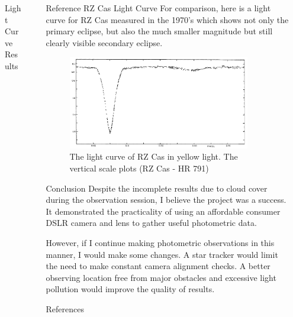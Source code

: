 \documentclass[final]{beamer}
\newlength{\sepwidth}
\newlength{\colwidth}
\newcommand{\separatorcolumn}{\begin{column}{\sepwidth}\end{column}}
\begin{document}
\begin{frame}[t]
\begin{columns}[t]
\begin{column}{\colwidth}
\begin{block}{Light Curve Results}
  \end{block}

\end{column}

\separatorcolumn

\begin{column}{\colwidth}

  \begin{block}{Reference RZ Cas Light Curve}
    For comparison, here is a light curve for RZ Cas measured in the 1970's
    which shows not only the primary eclipse, but also the much smaller magnitude
    but still clearly visible secondary eclipse.

    \begin{figure}
      \centering
      \includegraphics[width=0.9\textwidth]{Reference_RZ_Cas_Light_Curve.png}
        \caption{The light curve of RZ Cas in yellow light. The vertical scale plots \textbf{} (RZ Cas - HR 791) \cite{Chambliss_1976}}
    \end{figure}

  \end{block}

  \begin{block}{Conclusion}
    Despite the incomplete results due to cloud cover during the observation
    session, I believe the project was a success. It demonstrated the practicality
    of using an affordable consumer DSLR camera and lens to gather useful photometric
    data.

    However, if I continue making photometric observations in this manner, I would make some
    changes. A star tracker would limit the need to make constant camera
    alignment checks. A better observing location free from major obstacles and excessive
    light pollution would improve the quality of results.
  \end{block}

  \begin{block}{References}

    \nocite{*}
    \printbibliography

  \end{block}

\end{column}

\separatorcolumn
\end{columns}
\end{frame}
\end{document}
